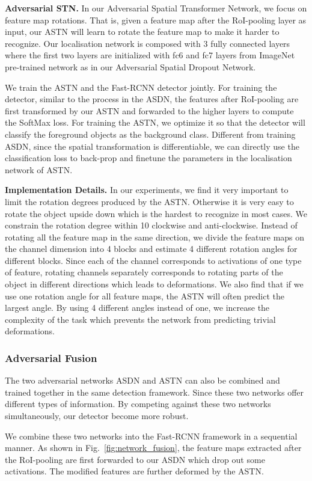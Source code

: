 \textbf{Adversarial STN.} In our Adversarial Spatial Transformer Network, we focus on feature map rotations. That is, given a feature map after the RoI-pooling layer as input, our ASTN will learn to rotate the feature map to make it harder to recognize. Our localisation network is composed with 3 fully connected layers where the first two layers are initialized with fc6 and fc7 layers from ImageNet pre-trained network as in our Adversarial Spatial Dropout Network. 

We train the ASTN and the Fast-RCNN detector jointly. For training the detector, similar to the process in the ASDN, the features after RoI-pooling are first transformed by our ASTN and forwarded to the higher layers to compute the SoftMax loss. For training the ASTN, we optimize it so that the detector will classify the foreground objects as the background class. Different from training ASDN, since the spatial transformation is differentiable, we can directly use the classification loss to back-prop and finetune the parameters in the localisation network of ASTN. 

\textbf{Implementation Details.} In our experiments, we find it very important to limit the rotation degrees produced by the ASTN. Otherwise it is very easy to rotate the object upside down which is the hardest to recognize in most cases. We constrain the rotation degree within  10{\degree} clockwise and anti-clockwise. Instead of rotating all the feature map in the same direction, we divide the feature maps on the channel dimension into 4 blocks and estimate 4 different rotation angles for different blocks. Since each of the channel corresponds to activations of one type of feature, rotating channels separately corresponds to rotating parts of the object in different directions which leads to deformations. We also find that if we use one rotation angle for all feature maps, the ASTN will often predict the largest angle. By using 4 different angles instead of one, we increase the complexity of the task which prevents the network from predicting trivial deformations. 

\vspace{-0.1in}
\subsubsection{Adversarial Fusion}
\vspace{-0.05in}
The two adversarial networks ASDN and ASTN can also be combined and trained together in the same detection framework. Since these two networks offer different types of information. By competing against these two networks simultaneously, our detector become more robust. 

We combine these two networks into the Fast-RCNN framework in a sequential manner. As shown in Fig.~\ref{fig:network_fusion}, the feature maps extracted after the RoI-pooling are first forwarded to our ASDN which drop out some activations. The modified features are further deformed by the ASTN. 








